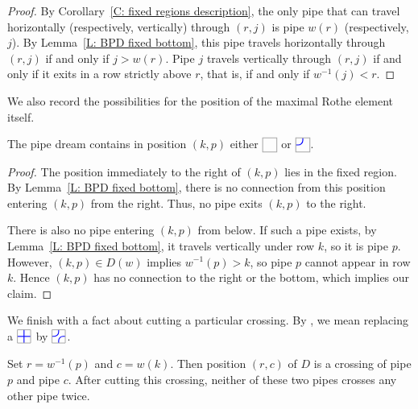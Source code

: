 \documentclass[10pt]{article}
\begin{document}
\begin{proof}
By Corollary~\ref{C: fixed regions description},
the only pipe that can travel horizontally (respectively, vertically) through $(r,j)$
is pipe $w(r)$ (respectively, $j$).
By Lemma~\ref{L: BPD fixed bottom},
this pipe travels horizontally through $(r,j)$
if and only if $j>w(r)$.
Pipe $j$ travels vertically through $(r,j)$
if and only if it exits in a row strictly above $r$,
that is, if and only if $w^{-1}(j)<r$.
\end{proof}

We also record the possibilities for the position
of the maximal Rothe element itself.

\begin{corollary}
\label{C: j or blank}
The pipe dream contains in position $(k,p)$ either $\BTILE$ or $\JTILE$.
\end{corollary}

\begin{proof}
The position immediately to the right of $(k,p)$
lies in the fixed region.
By Lemma~\ref{L: BPD fixed bottom},
there is no connection from this position
entering $(k,p)$ from the right.
Thus, no pipe exits $(k,p)$ to the right.

There is also no pipe entering $(k,p)$ from below.
If such a pipe exists, by Lemma~\ref{L: BPD fixed bottom},
it travels vertically under row $k$,
so it is pipe $p$.
However, $(k,p)\in D(w)$ implies $w^{-1}(p)>k$,
so pipe $p$ cannot appear in row $k$.
%
Hence $(k,p)$ has no connection to the right or the bottom, which implies our claim. 
\end{proof}

We finish with a fact about cutting a particular crossing.
By , we mean replacing a $\PTILE$ 
by $\ETILE$.

\begin{lemma}
\label{L: No double crossing after cut}
Set $r=w^{-1}(p)$ and $c=w(k)$.
Then position $(r,c)$ of $D$ is a crossing of pipe $p$ and pipe $c$.
After cutting this crossing,
neither of these two pipes crosses any other pipe twice.
\end{lemma}
\end{document}
